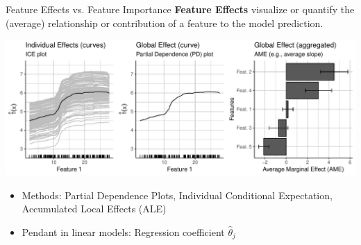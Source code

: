 \documentclass[11pt,compress,t,notes=noshow, xcolor=table]{beamer}
\begin{document}
\begin{vbframe}{Feature Effects vs. Feature Importance}
\textbf{Feature Effects} visualize or quantify the (average) relationship or contribution of a feature to the model prediction.
\begin{center}
\includegraphics[page=1, width=\textwidth]{figure/feature-effects}
\end{center}
  \begin{itemize}
    \item Methods: Partial Dependence Plots, Individual Conditional Expectation, Accumulated Local Effects (ALE)
    \item Pendant in linear models: Regression coefficient $\hat{\theta}_j$
  \end{itemize}
\framebreak


\end{vbframe}
\end{document}
